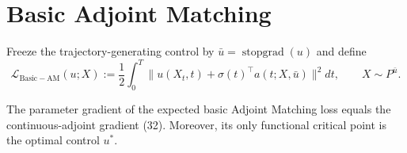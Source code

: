 \section{Basic Adjoint Matching}

Freeze the trajectory-generating control by $\bar u=\operatorname{stopgrad}(u)$ and define
\begin{equation*}
 \mathcal L_{\mathrm{Basic-AM}}(u;X)
 :=\frac12\int_0^T
 \|u(X_t,t)+\sigma(t)^\top a(t;X,\bar u)\|^2dt,
 \qquad X\sim P^{\bar u}.
 \tag{34}
\end{equation*}

\begin{proposition}
The parameter gradient of the expected basic Adjoint Matching loss equals the continuous-adjoint gradient (32).  Moreover, its only functional critical point is the optimal control $u^*$.
\end{proposition}

